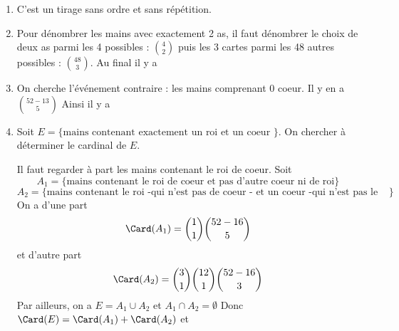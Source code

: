 \documentclass[a4paper, 11pt,reqno]{article}
\begin{document}
\begin{correction}
\begin{enumerate}
\item C'est un tirage sans ordre et sans répétition. 
\item Pour dénombrer les mains avec exactement 2 as, il faut dénombrer le choix de deux as parmi les 4 possibles : $\binom{4}{2}$ puis les 3 cartes parmi les 48 autres possibles : $\binom{48}{3}$. Au final il y  a 
\item On cherche l'événement contraire : les mains comprenant 0 coeur. Il y en a 
$\binom{52-13}{5}$ Ainsi il y  a
\item Soit $E=\{ \text{mains contenant  exactement un roi et un coeur }\}$. On chercher à déterminer le cardinal de $E$. 

Il faut regarder à part les mains contenant le roi de coeur. 
Soit $$A_1= \{ \text{mains contenant le roi de coeur et pas d'autre coeur ni de roi}\}$$
$$A_2= \{ \text{mains contenant le roi -qui n'est pas de coeur - et un coeur -qui n'est pas le roi.}\}$$
On a d'une part 
$$\Card(A_1) =  \binom{1}{1} \binom{52-16}{5} $$
et d'autre part
$$\Card(A_2) =  \binom{3}{1} \binom{12}{1} \binom{52-16}{3}$$
Par ailleurs, on a $E=A_1\cup A_2$ et $A_1\cap A_2=\emptyset$
Donc $\Card(E) = \Card(A_1) +\Card(A_2)$ et 




\end{enumerate}
\end{correction}
\end{document}

